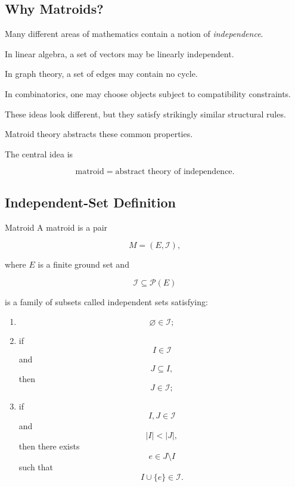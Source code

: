\subsection{Why Matroids?}
\label{subsec:why-matroids}

Many different areas of mathematics contain a notion of
\emph{independence}.

In linear algebra, a set of vectors may be linearly independent.

In graph theory, a set of edges may contain no cycle.

In combinatorics, one may choose objects subject to compatibility
constraints.

These ideas look different, but they satisfy strikingly similar
structural rules.

Matroid theory abstracts these common properties.

The central idea is

\[
\boxed{
\text{matroid}
=
\text{abstract theory of independence}.
}
\]

\subsection{Independent-Set Definition}
\label{subsec:matroid-independent-definition}

\begin{definitionbox}{Matroid}
A matroid is a pair

\[
\boxed{
M=(E,\mathcal{I}),
}
\]

where \(E\) is a finite ground set and

\[
\mathcal{I}\subseteq\mathcal{P}(E)
\]

is a family of subsets called independent sets satisfying:

\begin{enumerate}
    \item
    \[
    \varnothing\in\mathcal{I};
    \]

    \item if
    \[
    I\in\mathcal{I}
    \]
    and
    \[
    J\subseteq I,
    \]
    then
    \[
    J\in\mathcal{I};
    \]

    \item if
    \[
    I,J\in\mathcal{I}
    \]
    and
    \[
    |I|<|J|,
    \]
    then there exists
    \[
    e\in J\setminus I
    \]
    such that
    \[
    I\cup\{e\}\in\mathcal{I}.
    \]
\end{enumerate}
\end{definitionbox}

